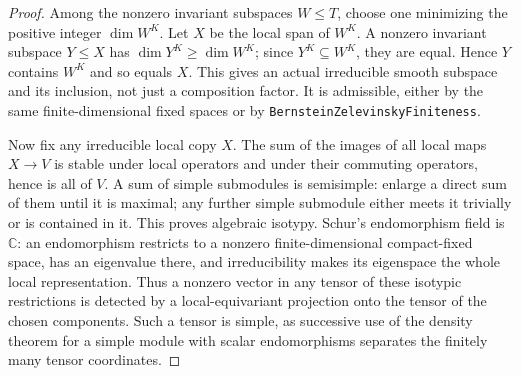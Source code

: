 \documentclass[11pt,a4paper]{article}
\numberwithin{equation}{section}
\theoremstyle{remark}\newtheorem{remark}[theorem]{Remark}
\begin{document}
\begin{proof}
Among the nonzero invariant subspaces \(W\le T\), choose one
minimizing the positive integer \(\dim W^K\).  Let \(X\) be the
local span of \(W^K\).  A nonzero invariant subspace \(Y\le X\)
has \(\dim Y^K\ge\dim W^K\); since \(Y^K\subseteq W^K\),
they are equal.  Hence \(Y\) contains \(W^K\) and so equals
\(X\).  This gives an actual irreducible smooth subspace and its
inclusion, not just a composition factor.  It is admissible, either
by the same finite-dimensional fixed spaces or by
\texttt{Bernstein\allowbreak Zelevinsky\allowbreak Finiteness}.

Now fix any irreducible local copy \(X\).  The sum of the images
of all local maps \(X\to V\) is stable under local operators and
under their commuting operators, hence is all of \(V\).  A sum of
simple submodules is semisimple: enlarge a direct sum of them until
it is maximal; any further simple submodule either meets it trivially
or is contained in it.  This proves algebraic isotypy.  Schur's
endomorphism field is \(\mathbb C\): an endomorphism restricts to
a nonzero finite-dimensional compact-fixed space, has an eigenvalue
there, and irreducibility makes its eigenspace the whole local
representation.  Thus a nonzero vector in any tensor of these
isotypic restrictions is detected by a local-equivariant projection
onto the tensor of the chosen components.  Such a tensor is simple,
as successive use of the density theorem for a simple module with
scalar endomorphisms separates the finitely many tensor coordinates.
\end{proof}

\end{document}
